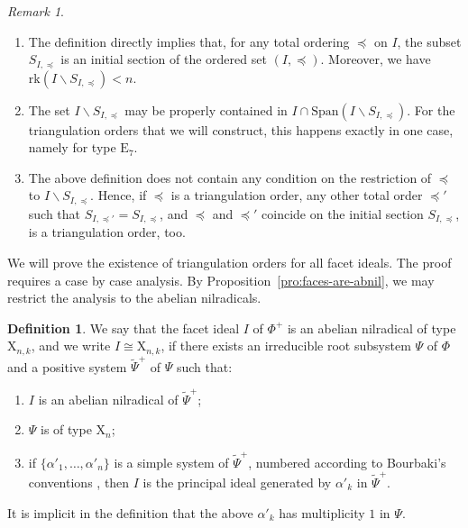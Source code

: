 \documentclass[10pt]{amsart}
\theoremstyle{definition}
\newtheorem{defi}[thm]{Definition}
\theoremstyle{remark}
\newtheorem{rem}[thm]{Remark}
\newcommand\wt{\widetilde}
\newcommand\smeno{\smallsetminus}
\newcommand\gen{\mathrm{Span}}
\newcommand\rk{\mathrm{rk}}
\newcommand\al{\alpha}
\newcommand\preq{\preccurlyeq}
\begin{document}
\begin{rem}\label{rem:ini-sec}~\\[-1em]
\begin{enumerate}
\item
The definition directly implies that, for any total ordering $\preq$  on $I$, the subset $S_{I,\preq}$ is an initial section of the ordered set $(I, \preq)$.
Moreover, we have $\rk(I\smeno S_{I,\preq})< n$.
\item 
The set $I\smeno S_{I,\preq}$ may be properly contained in $I\cap \gen(I\smeno S_{I,\preq})$. 
For the triangulation orders that we will construct, this
happens exactly in one case, namely for type $\mathrm E_{7}$.
\item
The above definition does not contain any condition on the restriction of $\preq$ to $I\smeno S_{I,\preq}$. 
Hence, if $\preq$ is a triangulation order, any other total order $\preq'$ such that  $S_{I,\preq'}=S_{I,\preq}$, and  $\preq$ and $\preq'$ coincide on the initial section $S_{I,\preq}$, is a triangulation order, too.
\end{enumerate}
\end{rem}

We will prove the existence of triangulation orders for all facet ideals.  
The proof requires a case by case analysis. 
By Proposition~\ref{pro:faces-are-abnil}, we may restrict the analysis to the abelian nilradicals.

\begin{defi}
We say that the facet ideal $I$ of $\Phi^+$  is an abelian nilradical of type $\mathrm X_{n,k}$, and we write $I\cong \mathrm X_{n,k}$, if there exists an irreducible root subsystem $\Psi$ of $\Phi$ and a positive system $\wt \Psi^+$ of $\Psi$ such that: 
\begin{enumerate}
\item
$I$ is an abelian nilradical of $\wt \Psi^+$;
\item 
$\Psi$ is of type $\mathrm X_n$; 
\item 
if $\{\al'_1, \dots, \al'_n\}$ is a simple system of $\wt \Psi^+$, numbered according to Bourbaki's conventions \cite{Bou}, then $I$ is the principal ideal generated by $\al'_k$ in $\wt \Psi^+$.
\end{enumerate}
\end{defi}

It is implicit in the definition that the above $\al'_k$ has multiplicity $1$ in $\Psi$. 
\end{document}
